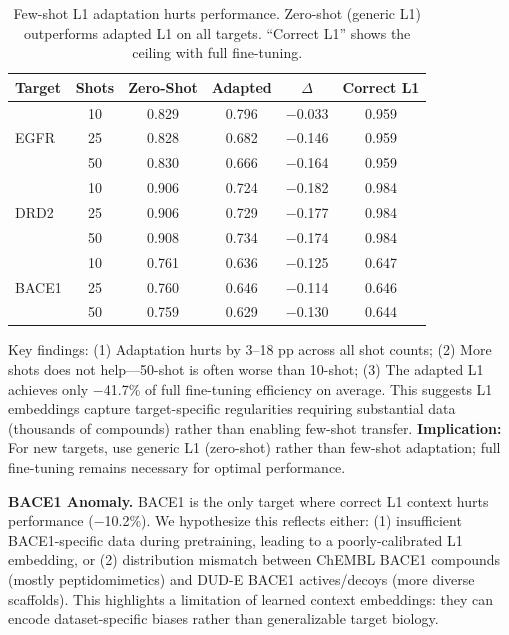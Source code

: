 \documentclass[runningheads]{llncs}
\begin{document}
\begin{table}[t]
\caption{Few-shot L1 adaptation hurts performance. Zero-shot (generic L1) outperforms adapted L1 on all targets. ``Correct L1'' shows the ceiling with full fine-tuning.}
\label{tab:fewshot}
\centering
\small
\begin{tabular}{@{}lccccc@{}}
\toprule
Target & Shots & Zero-Shot & Adapted & $\Delta$ & Correct L1 \\
\midrule
\multirow{3}{*}{EGFR} & 10 & 0.829 & 0.796 & $-$0.033 & 0.959 \\
 & 25 & 0.828 & 0.682 & $-$0.146 & 0.959 \\
 & 50 & 0.830 & 0.666 & $-$0.164 & 0.959 \\
\midrule
\multirow{3}{*}{DRD2} & 10 & 0.906 & 0.724 & $-$0.182 & 0.984 \\
 & 25 & 0.906 & 0.729 & $-$0.177 & 0.984 \\
 & 50 & 0.908 & 0.734 & $-$0.174 & 0.984 \\
\midrule
\multirow{3}{*}{BACE1} & 10 & 0.761 & 0.636 & $-$0.125 & 0.647 \\
 & 25 & 0.760 & 0.646 & $-$0.114 & 0.646 \\
 & 50 & 0.759 & 0.629 & $-$0.130 & 0.644 \\
\bottomrule
\end{tabular}
\end{table}

Key findings: (1) Adaptation hurts by 3--18 pp across all shot counts; (2) More shots does not help---50-shot is often worse than 10-shot; (3) The adapted L1 achieves only $-$41.7\% of full fine-tuning efficiency on average. This suggests L1 embeddings capture target-specific regularities requiring substantial data (thousands of compounds) rather than enabling few-shot transfer. \textbf{Implication:} For new targets, use generic L1 (zero-shot) rather than few-shot adaptation; full fine-tuning remains necessary for optimal performance.

\textbf{BACE1 Anomaly.}
BACE1 is the only target where correct L1 context hurts performance ($-$10.2\%). We hypothesize this reflects either: (1) insufficient BACE1-specific data during pretraining, leading to a poorly-calibrated L1 embedding, or (2) distribution mismatch between ChEMBL BACE1 compounds (mostly peptidomimetics) and DUD-E BACE1 actives/decoys (more diverse scaffolds). This highlights a limitation of learned context embeddings: they can encode dataset-specific biases rather than generalizable target biology.
\end{document}
